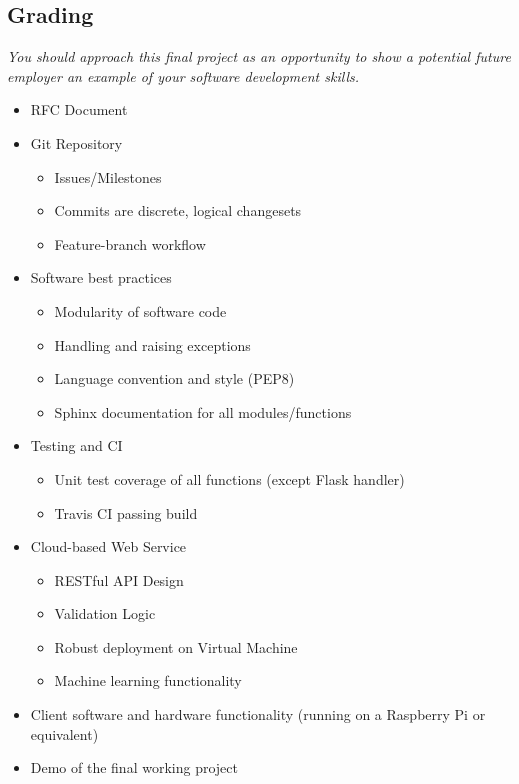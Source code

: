 \subsection*{Grading}
\emph{You should approach this final project as an opportunity to show a potential future employer an example of your software development skills.}
\begin{itemize}
\item RFC Document
\item Git Repository
	\begin{itemize}
		\item Issues/Milestones
		\item Commits are discrete, logical changesets
		\item Feature-branch workflow
	\end{itemize}
\item Software best practices
	\begin{itemize}
		\item Modularity of software code
		\item Handling and raising exceptions
		\item Language convention and style (PEP8)
		\item Sphinx documentation for all modules/functions
	\end{itemize}
\item Testing and CI
	\begin{itemize}
		\item Unit test coverage of all functions (except Flask handler)
		\item Travis CI passing build
	\end{itemize}
\item Cloud-based Web Service
	\begin{itemize}
		\item RESTful API Design 
		\item Validation Logic 
		\item Robust deployment on Virtual Machine 
		\item Machine learning functionality 
	\end{itemize}
\item Client software and hardware functionality (running on a Raspberry Pi or equivalent)
\item Demo of the final working project

\end{itemize}



